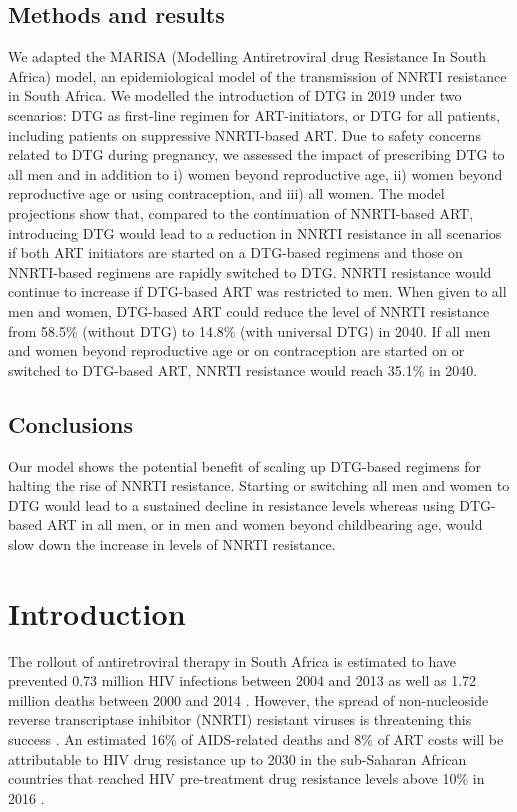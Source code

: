 \documentclass[10pt,letterpaper]{article}
\newcommand{\numbera}{58.5\% }
\newcommand{\numberb}{14.8\% }
\newcommand{\numberc}{35.1\% }
\begin{document}
\subsection*{Methods and results}
We adapted the MARISA (Modelling Antiretroviral drug Resistance In South Africa) model, an epidemiological model of the transmission of NNRTI resistance in South Africa. We modelled the introduction of DTG in 2019 under two scenarios: DTG as first-line regimen for ART-initiators, or DTG for all patients, including patients on suppressive NNRTI-based ART. Due to safety concerns related to DTG during pregnancy, we assessed the impact of prescribing DTG to all men and in addition to i) women beyond reproductive age, ii) women beyond reproductive age or using contraception, and iii) all women. The model projections show that, compared to the continuation of NNRTI-based ART, introducing DTG would lead to a reduction in NNRTI resistance in all scenarios if both ART initiators are started on a DTG-based regimens and those on NNRTI-based regimens are rapidly switched to DTG. NNRTI resistance would continue to increase if DTG-based ART was restricted to men. When given to all men and women, DTG-based ART could reduce the level of NNRTI resistance from \numbera (without DTG) to \numberb (with universal DTG) in 2040. If all men and women beyond reproductive age or on contraception are started on or switched to DTG-based ART, NNRTI resistance would reach \numberc in 2040.
\subsection*{Conclusions}
Our model shows the potential benefit of scaling up DTG-based regimens for halting the rise of NNRTI resistance. Starting or switching all men and women to DTG would lead to a sustained decline in resistance levels whereas using DTG-based ART in all men, or in men and women beyond childbearing age, would slow down the increase in levels of NNRTI resistance.

\linenumbers

\section*{Introduction}
The rollout of antiretroviral therapy in South Africa is estimated to have prevented 0.73 million HIV infections between 2004 and 2013 as well as 1.72 million deaths between 2000 and 2014 \cite{Heaton2015,Johnson2017a}. However, the spread of non-nucleoside reverse transcriptase inhibitor (NNRTI) resistant viruses is threatening this success \cite{Chimukangara2019b}. An estimated 16\% of AIDS-related deaths and 8\% of ART costs will be attributable to HIV drug resistance up to 2030 in the sub-Saharan African countries that reached HIV pre-treatment drug resistance levels above 10\% in 2016 \cite{Phillips2017}.
\end{document}
